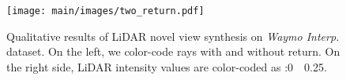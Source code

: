 \begin{figure}[t]
    \centering
        \texttt{[image: main/images/two\_return.pdf]}
        \caption{Qualitative results of LiDAR novel view synthesis on \textit{Waymo Interp.} dataset. On the left, we color-code rays {\setlength{\fboxsep}{0pt}\colorbox{hit}{with}} and {\setlength{\fboxsep}{0pt}\colorbox{ourgray}{without}} return. On the right side, LiDAR intensity values are color-coded as :0~\coolwarm~0.25.}
    \label{fig:iccv_two_return}
\end{figure}
